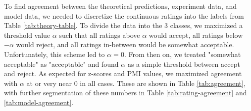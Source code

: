 \documentclass[11pt]{article}
\begin{document}
To find agreement between the theoretical predictions, experiment data, and model data, we needed to discretize the continuous ratings into the labels from Table \ref{tab:theory-table}. To divide the data into the 3 classes, we maximized a threshold value $\alpha$ such that all ratings above $\alpha$ would accept, all ratings below $-\alpha$ would reject, and all ratings in-between would 
be somewhat acceptable. Unfortunately, this scheme led to $\alpha=0$. From then on, we treated "somewhat acceptable" as "acceptable" and found $\alpha$ as a simple threshold between accept and reject. As expected for z-scores and PMI values, we maximized agreement with $\alpha$ at or very near 0 in all cases. These are shown in Table \ref{tab:agreement}, with further segmentation of these numbers in Table \ref{tab:rating-agreement} and \ref{tab:model-agreement}.
\end{document}
